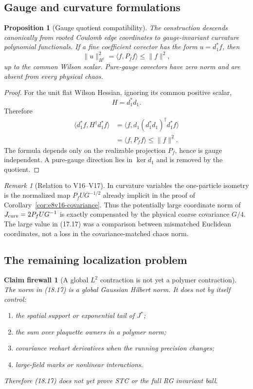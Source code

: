 \documentclass[11pt,oneside]{book}
\newtheorem{proposition}[theorem]{Proposition}
\newtheorem{firewall}[theorem]{Claim firewall}
\theoremstyle{definition}
\theoremstyle{remark}
\newtheorem{remark}[theorem]{Remark}
\begin{document}
\subsection{Gauge and curvature formulations}

\begin{proposition}[Gauge quotient compatibility]
\label{prop:e8v18-gauge}
The construction descends canonically from rooted Coulomb edge
coordinates to gauge-invariant curvature polynomial functionals.
If a fine coefficient covector has the form \(u=d_1^*f\), then
\[
 \|u\|_{H^\dagger}^2
 =\langle f,P_ff\rangle
 \leq\|f\|^2,                                      \tag{18.19}
\]
up to the common Wilson scalar.  Pure-gauge covectors have zero norm
and are absent from every physical chaos.
\end{proposition}

\begin{proof}
For the unit flat Wilson Hessian, ignoring its common positive scalar,
\[
 H=d_1^*d_1.
\]
Therefore
\[
\begin{split}
\langle d_1^*f,H^\dagger d_1^*f\rangle
 &=\langle f,d_1(d_1^*d_1)^\dagger d_1^*f\rangle\\
 &=\langle f,P_ff\rangle\leq\|f\|^2.
\end{split}
\]
The formula depends only on the realizable projection \(P_f\), hence
is gauge independent.  A pure-gauge direction lies in \(\ker d_1\)
and is removed by the quotient.
\end{proof}

\begin{remark}[Relation to V16--V17]
\label{rem:e8v18-relation}
In curvature variables the one-particle isometry is the normalized
map \(P_fUG^{-1/2}\) already implicit in the proof of
Corollary~\ref{cor:e8v16-covariance}.  Thus the potentially large
coordinate norm of \(J_{\rm curv}=2P_fUG^{-1}\) is exactly compensated
by the physical coarse covariance \(G/4\).  The large value in
(17.17) was a comparison between mismatched Euclidean coordinates,
not a loss in the covariance-matched chaos norm.
\end{remark}

\subsection{The remaining localization problem}

\begin{firewall}[A global \(L^2\) contraction is not yet a polymer
contraction]
\label{fire:e8v18-locality}
The norm in (18.17) is a global Gaussian Hilbert norm.  It does not by
itself control:
\begin{enumerate}
\item the spatial support or exponential tail of \(J^*\);
\item the sum over plaquette owners in a polymer norm;
\item covariance rechart derivatives when the running precision
changes;
\item large-field marks or nonlinear interactions.
\end{enumerate}
Therefore (18.17) does not yet prove STC or the full RG invariant
ball.
\end{firewall}
\end{document}
